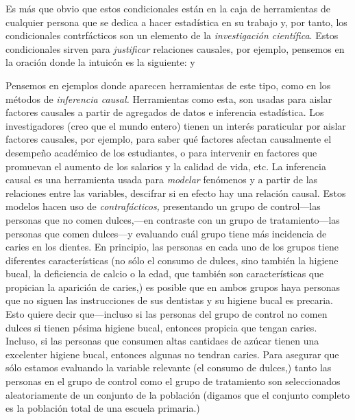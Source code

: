 



\parencite{} %




Es más que obvio que estos condicionales están en la caja de
herramientas de cualquier persona que se dedica a hacer
estadística en su trabajo y, por tanto, los condicionales
contrfácticos son un elemento de la \emph{investigación
científica}. Estos condicionales sirven para
\emph{justificar} relaciones causales, por ejemplo, pensemos
en la oración  donde la
intuicón es la siguiente:  y 

Pensemos en ejemplos donde aparecen herramientas de este
tipo, como en los métodos de \emph{inferencia causal.}
Herramientas como esta, son usadas para aislar factores
causales a partir de agregados de datos e inferencia
estadística. Los investigadores (creo que el mundo entero)
tienen un interés paraticular por aislar factores causales,
por ejemplo, para saber qué factores afectan causalmente el
desempeño académico de los estudiantes, o para intervenir en
factores que promuevan el aumento de los salarios y la
calidad de vida, etc. La inferencia causal es una
herramienta usada para \emph{modelar} fenómenos y a partir
de las relaciones entre las variables, descifrar si en
efecto hay una relación causal. Estos modelos hacen uso de
\emph{contrafácticos,} presentando un grupo de control---las
personas que no comen dulces,---en contraste con un grupo de
tratamiento---las personas que comen dulces---y evaluando
cuál grupo tiene más incidencia de caries en los dientes. En
principio, las personas en cada uno de los grupos tiene
diferentes características (no sólo el consumo de dulces,
sino también la higiene bucal, la deficiencia de calcio o la
edad, que también son características que propician la
aparición de caries,) es posible que en ambos grupos haya
personas que no siguen las instrucciones de sus dentistas y
su higiene bucal es precaria. Esto quiere decir
que---incluso si las personas del grupo de control no comen
dulces si tienen pésima higiene bucal, entonces propicia que
tengan caries. Incluso, si las personas que consumen altas
cantidaes de azúcar tienen una excelenter higiene bucal,
entonces algunas no tendran caries. Para asegurar que sólo
estamos evaluando la variable relevante (el consumo de
dulces,) tanto las personas en el grupo de control como el
grupo de tratamiento son seleccionados aleatoriamente de un
conjunto de la población (digamos que el conjunto completo
es la población total de una escuela primaria.)

